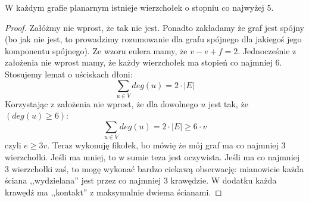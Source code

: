     \begin{theorem}
        W każdym grafie planarnym istnieje wierzchołek o stopniu co najwyżej 5.
    \end{theorem}
    \begin{proof}
        Załóżmy nie wprost, że tak nie jest. Ponadto zakładamy że graf jest spójny (bo jak nie jest, to prowadzimy rozumowanie dla grafu spójnego dla jakiegoś jego komponentu spójnego). Ze wzoru eulera mamy, że $v - e + f = 2$. Jednocześnie z założenia nie wprost mamy, że każdy wierzchołek ma stopień co najmniej 6. Stosujemy lemat o uściskach dłoni: 
        \begin{equation*}
            \sum_{u \in V} deg(u) = 2 \cdot |E|
        \end{equation*}
        Korzystając z założenia nie wprost, że dla dowolnego $u$ jest tak, że $(deg(u) \geq 6)$:
         \begin{equation*}
            \sum_{u \in V} deg(u) = 2 \cdot |E| \geq 6 \cdot v
        \end{equation*}
        czyli $e \geq 3v $. Teraz wykonuję fikołek, bo mówię że mój graf ma co najmniej 3 wierzchołki. Jeśli ma mniej, to w sumie teza jest oczywista. Jeśli ma co najmniej 3 wierzchołki zaś, to mogę wykonać bardzo ciekawą obserwację: mianowicie każda ściana ,,wydzielana'' jest przez co najmniej 3 krawędzie. W dodatku każda krawędź ma ,,kontakt'' z maksymalnie dwiema ścianami. 


\end{proof}
